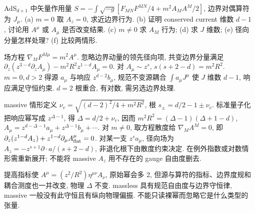 \begin{exercise}
AdS$_{d+1}$ 中矢量作用量 $S=-\int\sqrt{-g}[F_{MN}F^{MN}/4+m^2A_MA^M/2]$, 边界对偶算符为 $J_\mu$.
(a) $m=0$ 取 $A_z=0$, 求近边界行为.
(b) 证明 conserved current 维数 $d-1$, 讨论用 $A^\mu$ 或 $A_\mu$ 是否改变结果.
(c) $m\ne0$ 求 $A_M$ 行为; (d) 求 $J$ 维数; (e) 径向分量怎样处理? (f) 比较两情形.
\end{exercise}
\begin{solution}
场方程 $\nabla_MF^{M\mu}=m^2A^\mu$. 忽略边界动量的领先径向项, 共变边界分量满足 $\partial_z(z^{3-d}\partial_zA_\mu)-m^2R^2z^{1-d}A_\mu=0$. 对 $A_\mu\sim z^s$, $s(s+2-d)=m^2R^2$. $m=0,d>2$ 得源 $a_\mu$ 与响应 $z^{d-2}b_\mu$, 规范不变源耦合 $\int a_\mu J^\mu$ 使 $J$ 维数 $d-1$, 响应满足守恒约束. $d=2$ 根重合, 有对数, 需另选边界处理.

massive 情形定义 $\nu_v=\sqrt{(d-2)^2/4+m^2R^2}$, 根 $s_\pm=d/2-1\pm\nu_v$. 标准量子化把响应幂写成 $z^{\Delta-1}$, 得 $\Delta=d/2+\nu_v$, 因而
$m^2R^2=(\Delta-1)(\Delta+1-d)$,
$A_\mu=z^{d-\Delta-1}a_\mu+z^{\Delta-1}b_\mu+\cdots$.
对 $m\ne0$, 取方程散度给 $\nabla_MA^M=0$, 即 $\partial_z(z^{1-d}A_z)+z^{1-d}\partial_\mu A^\mu_{\rm flat}=0$. 对某一支 $z^s a_\mu$, 径向场为 $A_z=-z^{s+1}\partial\cdot a/(s+2-d)$, 非退化根下由散度约束决定. 在例外指数或对数情形需重新展开; 不能将 massive $A_z$ 用不存在的 gauge 自由度删去.

提高指标使 $A^\mu=(z^2/R^2)\eta^{\mu\nu}A_\nu$, 原始幂会多 2, 但源与算符的指标、边界度规和耦合测度也一并改变, 物理 $\Delta$ 不变. massless 具有规范自由度与边界守恒律, massive 一般没有此守恒且有纵向物理偏振. 不能只读裸幂而忽略它是什么类型的张量.
\end{solution}

